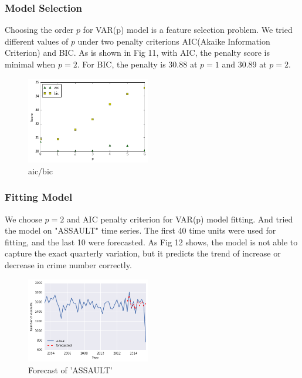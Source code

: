 \documentclass[11pt,conference]{IEEEtran}
\begin{document}
\subsubsection{Model Selection}
Choosing the order $p$ for VAR(p) model is a feature selection problem. We tried different values of $p$ under two penalty criterions AIC(Akaike Information Criterion) and BIC. As is shown in Fig 11, with AIC, the penalty score is minimal when $p=2$. For BIC, the penalty is 30.88 at $p=1$ and 30.89 at $p=2$.
\begin{figure}[H]
\begin{center}
\includegraphics [width=0.48\textwidth]{pics/aic_bic.png}
\caption{aic/bic}
\end{center}
\end{figure}

\subsubsection{Fitting Model}
We choose $p=2$ and AIC penalty criterion for VAR(p) model fitting. And tried the model on "ASSAULT" time series. The first 40 time units were used for fitting, and the last 10 were forecasted. As Fig 12 shows, the model is not able to capture the exact quarterly variation, but it predicts the trend of increase or decrease in crime number correctly.
\begin{figure}%
\begin{center}
\includegraphics [width=0.48\textwidth]{pics/assault_forecast.png}
\caption{Forecast of 'ASSAULT'}
\end{center}
\end{figure}
\end{document}
